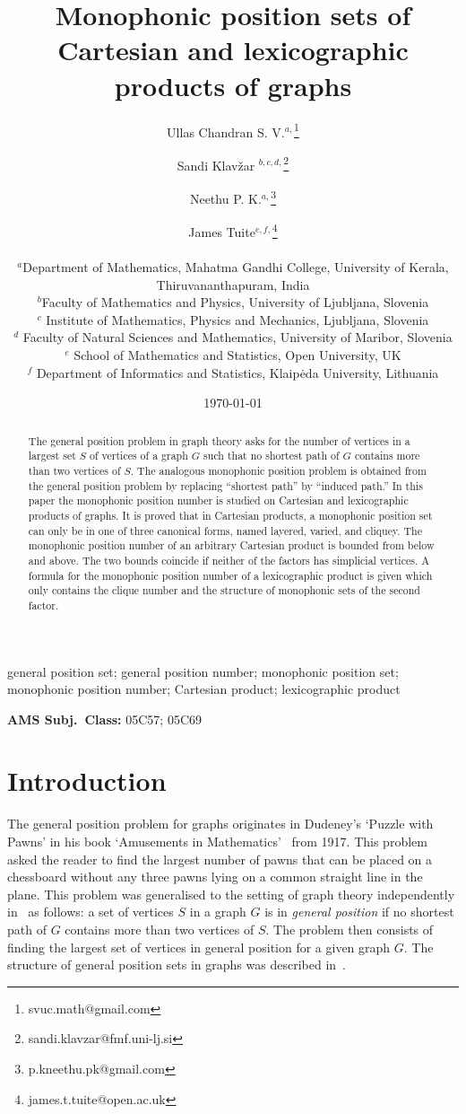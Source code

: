 \documentclass[12pt]{article}
\title{Monophonic position sets of Cartesian and lexicographic products of graphs}
\author{Ullas Chandran S. V.$^{a,}$\footnote{svuc.math@gmail.com}
\and
Sandi Klav\v{z}ar $^{b,c,d,}$\footnote{sandi.klavzar@fmf.uni-lj.si}
\and
Neethu P. K.$^{a,}$\footnote{p.kneethu.pk@gmail.com}
\and
James Tuite$^{e,f,}$\footnote{james.t.tuite@open.ac.uk} 
\\\\
$^{a}$\small Department of Mathematics, Mahatma Gandhi College, University of Kerala, \\ \small Thiruvananthapuram, India\\
$^{b}$\small Faculty of Mathematics and Physics, University of Ljubljana, Slovenia\\
$^{c}$ \small Institute of Mathematics, Physics and Mechanics, Ljubljana, Slovenia \\
$^{d}$ \small Faculty of Natural Sciences and Mathematics, University of Maribor, Slovenia\\
$^{e}$ \small School of Mathematics and Statistics, Open University, UK\\
$^{f}$ \small Department of Informatics and Statistics, Klaip\.{e}da University, Lithuania
}
\date{\today}
\begin{document}
\maketitle

\vspace*{-7mm}
\begin{abstract}
The general position problem in graph theory asks for the number of vertices in a largest set $S$ of vertices of a graph $G$ such that no shortest path of $G$ contains more than two vertices of $S$. The analogous monophonic position problem is obtained from the general position problem by replacing ``shortest path'' by ``induced path.'' In this paper the monophonic position number is studied on Cartesian and lexicographic products of graphs. It is proved that in Cartesian products, a monophonic position set can only be in one of three canonical forms, named layered, varied, and cliquey. The monophonic position number of an arbitrary Cartesian product is bounded from below and above. The two bounds coincide if neither of the factors has simplicial vertices. A formula for the monophonic position number of a lexicographic product is given which only contains the clique number and the structure of monophonic sets of the second factor. 
\end{abstract}

 general position set; general position number; monophonic position set; monophonic position number; Cartesian product; lexicographic product

\medskip\noindent

{\bf AMS Subj.\ Class:} 05C57; 05C69

\section{Introduction}
\label{sec:intro}
The general position problem for graphs originates in Dudeney's `Puzzle with Pawns' in his book `Amusements in Mathematics'~\cite{dudeney-1917} from 1917. This problem asked the reader to find the largest number of pawns that can be placed on a chessboard without any three pawns lying on a common straight line in the plane. This problem was generalised to the setting of graph theory independently in~\cite{ullas-2016, manuel-2018a} as follows: a set of vertices $S$ in a graph $G$ is in \emph{general position} if no shortest path of $G$ contains more than two vertices of $S$. The problem then consists of finding the largest set of vertices in general position for a given graph $G$. The structure of general position sets in graphs was described in~\cite{AnaChaChaKlaTho}.
\end{document}
